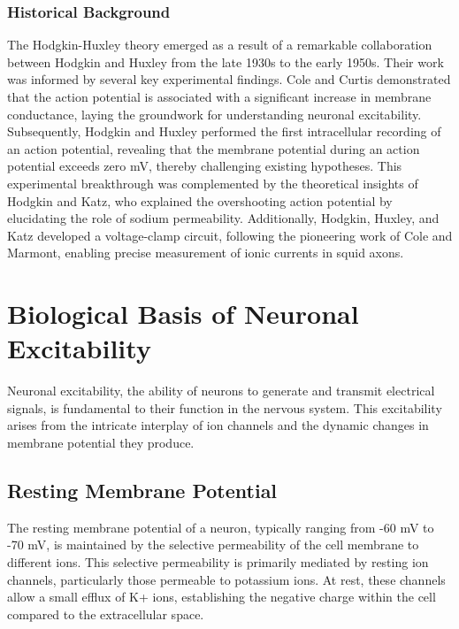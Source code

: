 \documentclass[12pt,a4paper]{report}
\begin{document}
\subsubsection{Historical Background}

The Hodgkin-Huxley theory emerged as a result of a remarkable collaboration between Hodgkin and Huxley from the late 1930s to the early 1950s. Their work was informed by several key experimental findings. Cole and Curtis demonstrated that the action potential is associated with a significant increase in membrane conductance, laying the groundwork for understanding neuronal excitability\cite{Cole1939}. Subsequently, Hodgkin and Huxley performed the first intracellular recording of an action potential, revealing that the membrane potential during an action potential exceeds zero mV, thereby challenging existing hypotheses\cite{Hodgkin1939}. This experimental breakthrough was complemented by the theoretical insights of Hodgkin and Katz, who explained the overshooting action potential by elucidating the role of sodium permeability\cite{Hodgkin1949}. Additionally, Hodgkin, Huxley, and Katz developed a voltage-clamp circuit, following the pioneering work of Cole and Marmont, enabling precise measurement of ionic currents in squid axons\cite{Hausser2000}.

\section{Biological Basis of Neuronal Excitability}

Neuronal excitability, the ability of neurons to generate and transmit electrical signals, is fundamental to their function in the nervous system. This excitability arises from the intricate interplay of ion channels and the dynamic changes in membrane potential they produce.

\subsection{Resting Membrane Potential}

The resting membrane potential of a neuron, typically ranging from -60 mV to -70 mV, is maintained by the selective permeability of the cell membrane to different ions. This selective permeability is primarily mediated by resting ion channels, particularly those permeable to potassium ions. At rest, these channels allow a small efflux of K+ ions, establishing the negative charge within the cell compared to the extracellular space.
\end{document}
